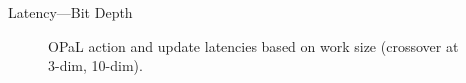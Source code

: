 \documentclass[aspectratio=169,xcolor={dvipsnames}
,handout
]{beamer}
\newcommand{\approachshort}{OPaL}
\begin{document}
\begin{frame}{Latency---Bit Depth}
	\begin{figure}
		\centering
		\begin{subfigure}{0.49\linewidth}
		\end{subfigure}
		\begin{subfigure}{0.49\linewidth}
		\end{subfigure}
	\caption{\approachshort{} action and update latencies based on work size (crossover at 3-dim, 10-dim).}
	\end{figure}
\end{frame}
\end{document}
